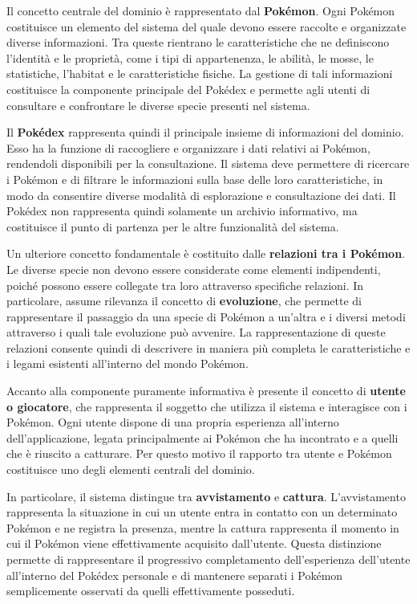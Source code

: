 \documentclass[a4paper,12pt]{report}
\begin{document}
\vspace{0,5 cm}
Il concetto centrale del dominio è rappresentato dal \textbf{Pokémon}. Ogni Pokémon costituisce un elemento del sistema del quale devono essere raccolte e organizzate diverse informazioni. Tra queste rientrano le caratteristiche che ne definiscono l'identità e le proprietà, come i tipi di appartenenza, le abilità, le mosse, le statistiche, l'habitat e le caratteristiche fisiche. La gestione di tali informazioni costituisce la componente principale del Pokédex e permette agli utenti di consultare e confrontare le diverse specie presenti nel sistema.

\vspace{0,5 cm}
Il \textbf{Pokédex} rappresenta quindi il principale insieme di informazioni del dominio. Esso ha la funzione di raccogliere e organizzare i dati relativi ai Pokémon, rendendoli disponibili per la consultazione. Il sistema deve permettere di ricercare i Pokémon e di filtrare le informazioni sulla base delle loro caratteristiche, in modo da consentire diverse modalità di esplorazione e consultazione dei dati. Il Pokédex non rappresenta quindi solamente un archivio informativo, ma costituisce il punto di partenza per le altre funzionalità del sistema.

\vspace{0,5 cm}
Un ulteriore concetto fondamentale è costituito dalle \textbf{relazioni tra i Pokémon}. Le diverse specie non devono essere considerate come elementi indipendenti, poiché possono essere collegate tra loro attraverso specifiche relazioni. In particolare, assume rilevanza il concetto di \textbf{evoluzione}, che permette di rappresentare il passaggio da una specie di Pokémon a un'altra e i diversi metodi attraverso i quali tale evoluzione può avvenire. La rappresentazione di queste relazioni consente quindi di descrivere in maniera più completa le caratteristiche e i legami esistenti all'interno del mondo Pokémon.

\vspace{0,5 cm}
Accanto alla componente puramente informativa è presente il concetto di \textbf{utente o giocatore}, che rappresenta il soggetto che utilizza il sistema e interagisce con i Pokémon. Ogni utente dispone di una propria esperienza all'interno dell'applicazione, legata principalmente ai Pokémon che ha incontrato e a quelli che è riuscito a catturare. Per questo motivo il rapporto tra utente e Pokémon costituisce uno degli elementi centrali del dominio.

\vspace{0,5 cm}
In particolare, il sistema distingue tra \textbf{avvistamento} e \textbf{cattura}. L'avvistamento rappresenta la situazione in cui un utente entra in contatto con un determinato Pokémon e ne registra la presenza, mentre la cattura rappresenta il momento in cui il Pokémon viene effettivamente acquisito dall'utente. Questa distinzione permette di rappresentare il progressivo completamento dell'esperienza dell'utente all'interno del Pokédex personale e di mantenere separati i Pokémon semplicemente osservati da quelli effettivamente posseduti.
\end{document}
